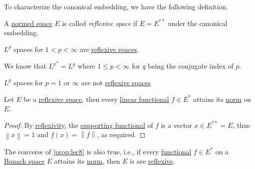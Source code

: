 To characterize the canonical embedding, we have the following definition.

\begin{definition}\label{def:reflexive-space}
	A \hyperref[def:normed-vector-space]{normed space} \(E\) is called \emph{reflexive space} if \(E = E^{\ast\ast} \) under the canonical embedding.
\end{definition}

\begin{eg}
	\(L^p\) spaces for \(1 < p < \infty \) are \hyperref[def:reflexive-space]{reflexive spaces}.
\end{eg}
\begin{explanation}
	We know that \({L^p}^{\ast} = L^q\) where \(1 \leq p < \infty \) for \(q\) being the conjugate index of \(p\).
\end{explanation}
\begin{eg}
	\(L^p\) spaces for \(p = 1\) or \(\infty \) are not \hyperref[def:reflexive-space]{reflexive spaces}
\end{eg}

\begin{proposition}\label{prop:lec8}
	Let \(E\) be a \hyperref[def:reflexive-space]{reflexive space}, then every \hyperref[def:linear-functional]{linear functional} \(f\in E^{\ast} \) attains its \hyperref[def:norm]{norm} on \(E\).
\end{proposition}
\begin{proof}
	By \hyperref[def:reflexive-space]{reflexivity}, the \hyperref[thm:supporting-functional]{supporting functional} of \(f\) is a vector \(x\in E^{\ast\ast} = E\), thus \(\left\lVert x\right\rVert = 1\) and \(f(x) = \left\lVert f\right\rVert\), as required.
\end{proof}

\begin{remark}
	The converse of \autoref{prop:lec8} is also true, i.e., if every \hyperref[def:linear-functional]{functional} \(f\in E^{\ast} \) on a \hyperref[def:Banach-space]{Banach space} \(E\) attains its \hyperref[def:norm]{norm}, then \(E\) is are \hyperref[def:reflexive-space]{reflexive}.
\end{remark}